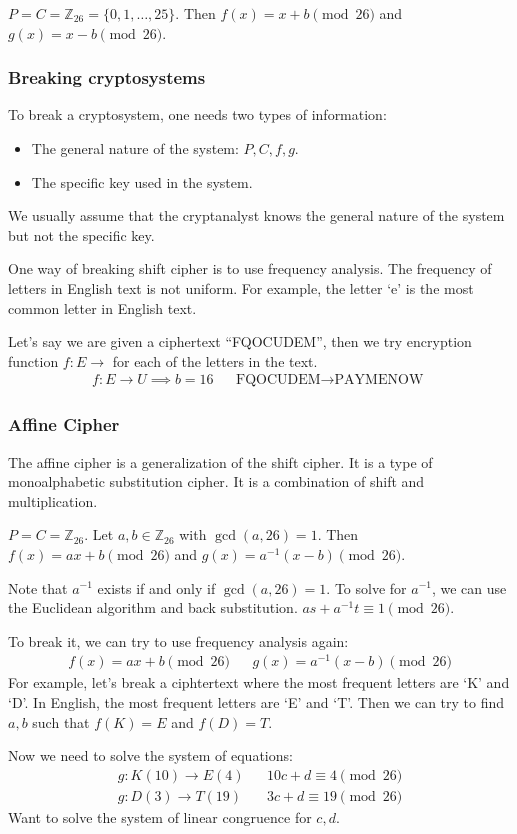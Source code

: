 \documentclass[letterpaper,12pt,oneside]{article}
\begin{document}
$P=C=\mathbb{Z}_{26}= \{0,1,\ldots,25\}$. Then $f(x)=x+b \pmod {26}$ and $g(x)=x-b \pmod {26}$.
\subsubsection{Breaking cryptosystems}
To break a cryptosystem, one needs two types of information:\begin{itemize}
    \item The general nature of the system: $P,C,f,g$.
    \item The specific key used in the system.
\end{itemize}
We usually assume that the cryptanalyst knows the general nature of the system but not the specific key.

One way of breaking shift cipher is to use frequency analysis. The frequency of letters in English text is not uniform. For example, the letter `e' is the most common letter in English text.

Let's say we are given a ciphertext ``FQOCUDEM'', then we try encryption function $f:E \to$ for each of the letters in the text. \begin{align*}
    f:E\to U \implies b=16 && \text{FQOCUDEM}\to \text{PAYMENOW }
\end{align*}
\subsubsection{Affine Cipher}
The affine cipher is a generalization of the shift cipher. It is a type of monoalphabetic substitution cipher. It is a combination of shift and multiplication.

$P=C=\mathbb{Z}_{26}$. Let $a,b\in \mathbb{Z}_{26}$ with $\gcd(a,26)=1$. Then $f(x)=ax+b \pmod {26}$ and $g(x)=a^{-1}(x-b) \pmod {26}$.

Note that $a^{-1}$ exists if and only if $\gcd(a,26)=1$. To solve for $a^{-1}$, we can use the Euclidean algorithm and back substitution. $as+a^{-1}t\equiv 1 \pmod {26}$. 

To break it, we can try to use frequency analysis again: 
\begin{align*}
    f(x)=ax+b \pmod {26} && g(x)=a^{-1}(x-b) \pmod {26}
\end{align*}
For example, let's break a ciphtertext where the most frequent letters are `K' and `D'. In English, the most frequent letters are `E' and `T'. Then we can try to find $a,b$ such that $f(K)=E$ and $f(D)=T$.

Now we need to solve the system of equations: \begin{align*}
    g:K(10)\to E(4) && 10c+d\equiv 4 \pmod {26} \\
    g:D(3)\to T(19) && 3c+d\equiv 19 \pmod {26}
\end{align*}
Want to solve the system of linear congruence for $c,d$.
\end{document}

